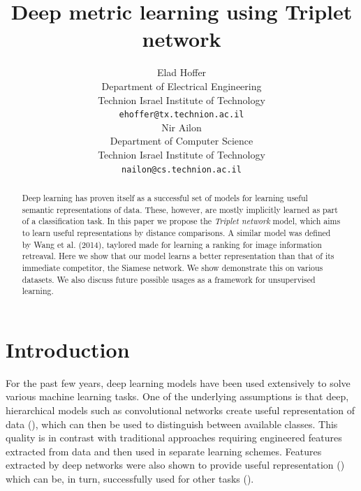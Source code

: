 \documentclass{article} %
\title{Deep metric learning using Triplet network}
\author{
Elad Hoffer \\
Department of Electrical Engineering\\
Technion Israel Institute of Technology\\
\texttt{ehoffer@tx.technion.ac.il} \\
\And
Nir Ailon \\
Department of Computer Science\\
Technion Israel Institute of Technology\\
\texttt{nailon@cs.technion.ac.il}
}
\begin{document}
\maketitle

\begin{abstract}
Deep learning has proven itself as a successful set of models for learning useful semantic representations of data. These, however, are mostly implicitly learned as part of a classification task.
In this paper we propose the \emph{Triplet network} model, which aims to learn useful representations by distance comparisons.
A similar model was defined by Wang et al. (2014), taylored made for learning a ranking for image information retreaval.  Here
we show that our model learns a better representation than that of its immediate competitor, the Siamese network.
 We show demonstrate this on various datasets.   We also discuss future possible usages as a framework for unsupervised learning.
\end{abstract}


\section{Introduction}
For the past few years, deep learning models have been used extensively to solve various machine learning tasks. One of the underlying assumptions is that deep, hierarchical models such as convolutional networks
create useful representation of data (\citet{Bengio2009,Hinton2007}), which can then be used to distinguish between available classes.
This quality is in contrast with traditional approaches  requiring engineered features extracted from data and then used in separate learning schemes.
Features extracted by deep networks were also shown to provide useful representation (\citet{Zeiler2013,Sermanet}) which can be, in turn, successfully used for other tasks (\citet{Razavian2014}).  %
\end{document}
